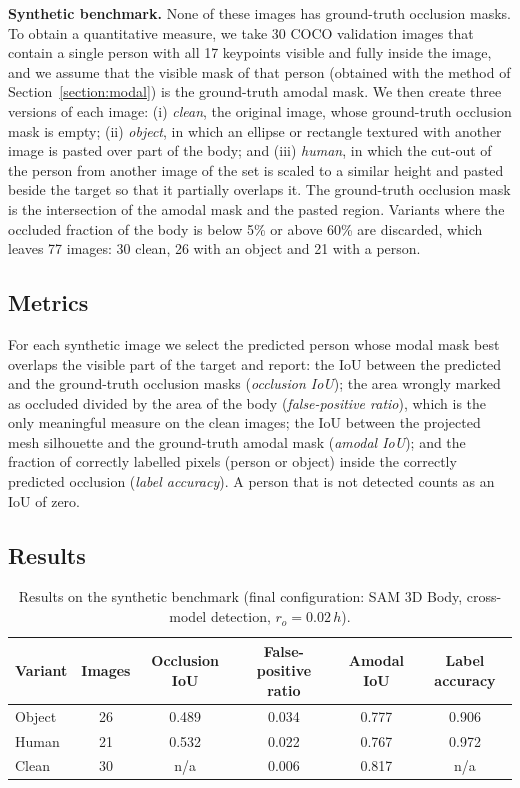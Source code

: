 \documentclass[11pt,a4paper]{article}
\begin{document}
\textbf{Synthetic benchmark.} None of these images has ground-truth occlusion masks. To obtain a quantitative measure, we take 30 COCO validation images that contain a single person with all 17 keypoints visible and fully inside the image, and we assume that the visible mask of that person (obtained with the method of Section~\ref{section:modal}) is the ground-truth amodal mask. We then create three versions of each image: (i) \emph{clean}, the original image, whose ground-truth occlusion mask is empty; (ii) \emph{object}, in which an ellipse or rectangle textured with another image is pasted over part of the body; and (iii) \emph{human}, in which the cut-out of the person from another image of the set is scaled to a similar height and pasted beside the target so that it partially overlaps it. The ground-truth occlusion mask is the intersection of the amodal mask and the pasted region. Variants where the occluded fraction of the body is below 5\% or above 60\% are discarded, which leaves 77 images: 30 clean, 26 with an object and 21 with a person.

\subsection{Metrics}
For each synthetic image we select the predicted person whose modal mask best overlaps the visible part of the target and report: the IoU between the predicted and the ground-truth occlusion masks (\emph{occlusion IoU}); the area wrongly marked as occluded divided by the area of the body (\emph{false-positive ratio}), which is the only meaningful measure on the clean images; the IoU between the projected mesh silhouette and the ground-truth amodal mask (\emph{amodal IoU}); and the fraction of correctly labelled pixels (person or object) inside the correctly predicted occlusion (\emph{label accuracy}). A person that is not detected counts as an IoU of zero.

\subsection{Results}

\begin{table}[!h]
  \centering
  \caption{Results on the synthetic benchmark (final configuration: SAM 3D Body, cross-model detection, $r_o=0.02\,h$).}
  \label{tab:synthetic}
  \begin{tabular}{lccccc}
    \toprule
    Variant & Images & Occlusion IoU & False-positive ratio & Amodal IoU & Label accuracy \\
    \midrule
    Object & 26 & 0.489 & 0.034 & 0.777 & 0.906 \\
    Human  & 21 & 0.532 & 0.022 & 0.767 & 0.972 \\
    Clean  & 30 & n/a & 0.006 & 0.817 & n/a \\
    \bottomrule
  \end{tabular}
\end{table}
\end{document}
